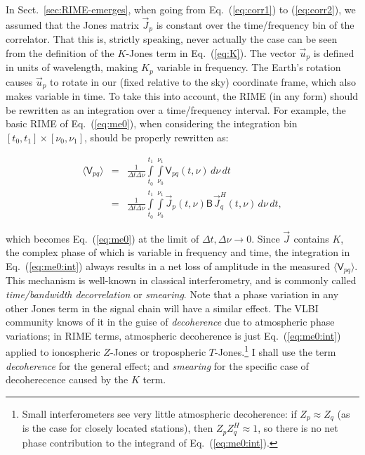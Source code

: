\documentclass{aa}
\newcommand{\herm}{H}
\newcommand{\jones}[2]{\vec {#1}_{#2}}
\newcommand{\jonesT}[2]{\vec {#1}^{\herm}_{#2}}
\newcommand{\coh}[2]{\mathsf{{#1}}_{{#2}}}
\begin{document}
In Sect.~\ref{sec:RIME-emerges}, when going from Eq.~(\ref{eq:corr1}) to (\ref{eq:corr2}), we assumed that the Jones matrix $\jones{J}{p}$ is constant over the time/frequency bin of the correlator. That this is, strictly speaking, never actually the case can be seen from the definition of the $K$-Jones term in Eq.~(\ref{eq:K}). The vector $\vec u_p$ is defined in units of wavelength, making $K_p$ variable in frequency. The Earth's rotation causes $\vec u_p$ to rotate in our (fixed relative to the sky) coordinate frame, which also makes variable in time. To take this into account, the RIME (in any form) should be rewritten as an integration over a time/frequency interval. For example, the basic RIME of Eq.~(\ref{eq:me0}), when considering the integration bin $[t_0,t_1]\times[\nu_0,\nu_1]$, should be properly rewritten as:

\begin{eqnarray}
\langle \coh{V}{pq} \rangle & = & \frac{1}{\Delta t\Delta\nu}\int\limits^{t_1}_{t_0} \int\limits^{\nu_1}_{\nu_0} \coh{V}{pq}(t,\nu)\,d\nu\,dt \nonumber \\
\label{eq:me0:int}
& = & \frac{1}{\Delta t\Delta\nu}\int\limits^{t_1}_{t_0} \int\limits^{\nu_1}_{\nu_0} \jones{J}{p} (t,\nu) \coh{B}{}  \jonesT{J}{q}(t,\nu) \, d\nu\,dt,
\end{eqnarray}

which becomes Eq.~(\ref{eq:me0}) at the limit of $\Delta t,\Delta\nu \to 0$. Since $\jones{J}{}$ contains $K$, the complex phase of which is variable in frequency and time, the integration in Eq.~(\ref{eq:me0:int}) always results in a net loss of amplitude in the measured $\langle \coh{V}{pq} \rangle $. This mechanism is well-known in classical interferometry, and is commonly called {\em time/bandwidth decorrelation} or {\em smearing}. Note that a phase variation in any other Jones term in the signal chain will have a similar effect. The VLBI community knows of it in the guise of {\em decoherence} due to atmospheric phase variations; in RIME terms, atmospheric decoherence is just Eq.~(\ref{eq:me0:int}) applied to ionospheric $Z$-Jones or tropospheric $T$-Jones.\footnote{Small interferometers see very little atmospheric decoherence: if $Z_p\approx Z_q$ (as is the case for closely located stations), then $Z_p Z^\herm_q \approx 1$, so there is no net phase contribution to the integrand of Eq.~(\ref{eq:me0:int}).} I shall use the term {\em decoherence} for the general effect; and {\em smearing} for the specific case of decoherecence caused by the $K$ term.
\end{document}
